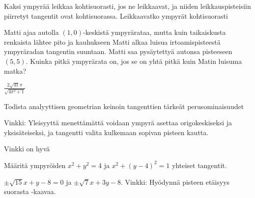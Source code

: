 \begin{tehtavasivu}
\begin{tehtava}
Kaksi ympyrää leikkaa kohtisuorasti, jos ne leikkaavat, ja niiden leikkauspisteisiin piirretyt tangentit ovat kohtisuorassa. Leikkaavatko ympyrät kohtisuorasti
\begin{alakohdat}
\end{alakohdat}  
\begin{vastaus}
\begin{alakohdat}
\end{alakohdat}
\end{vastaus}
\end{tehtava}

\begin{tehtava}
Matti ajaa autolla $(1,0)$-keskistä ympyrärataa, mutta kuin taikaiskusta renkaista lähtee pito ja kauhukseen Matti alkaa luisua irtoamispisteestä ympyräradan tangentin suuntaan. Matti saa pysäytettyä autonsa pisteeseen $(5,5)$. Kuinka pitkä ympyrärata on, jos se on yhtä pitkä kuin Matin luisuma matka?
\begin{vastaus}
$\frac{2\sqrt{41}\pi}{\sqrt{4\pi^2+1}}$
\end{vastaus}
\end{tehtava}

\begin{tehtava}
Todista analyyttisen geometrian keinoin tangenttien tärkeät perusominaisuudet
\begin{alakohdat}
\end{alakohdat}
Vinkki: Yleisyyttä menettämättä voidaan ympyrä asettaa origokeskiseksi ja yksisäteiseksi, ja tangentti valita kulkemaan sopivan pisteen kautta.
\begin{vastaus}
Vinkki on hyvä
\end{vastaus}
\end{tehtava}

\begin{tehtava}
Määritä ympyröiden $x^2+y^2 = 4$ ja $x^2+(y-4)^2 = 1$ yhteiset tangentit.

\begin{vastaus}
$\pm\sqrt{15}x+y-8= 0$ ja $\pm\sqrt{7}x+3y-8$. Vinkki: Hyödynnä pisteen etäisyys suorasta -kaavaa.
\end{vastaus}
\end{tehtava}


\end{tehtavasivu}